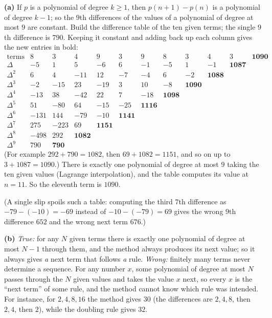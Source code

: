 \textbf{(a)} If $p$ is a polynomial of degree $k\ge1$, then $p(n+1)-p(n)$ is a polynomial of degree $k-1$; so the $9$th differences of the values of a polynomial of degree at most $9$ are constant. Build the difference table of the ten given terms; the single $9$th difference is $790$. Keeping it constant and adding back up each column gives the new entries in bold:
\[\begin{array}{c|ccccccccccc}
\text{terms}&8&3&4&9&3&9&8&3&4&3&\mathbf{1090}\\
\Delta&-5&1&5&-6&6&-1&-5&1&-1&\mathbf{1087}&\\
\Delta^2&6&4&-11&12&-7&-4&6&-2&\mathbf{1088}&&\\
\Delta^3&-2&-15&23&-19&3&10&-8&\mathbf{1090}&&&\\
\Delta^4&-13&38&-42&22&7&-18&\mathbf{1098}&&&&\\
\Delta^5&51&-80&64&-15&-25&\mathbf{1116}&&&&&\\
\Delta^6&-131&144&-79&-10&\mathbf{1141}&&&&&&\\
\Delta^7&275&-223&69&\mathbf{1151}&&&&&&&\\
\Delta^8&-498&292&\mathbf{1082}&&&&&&&&\\
\Delta^9&790&\mathbf{790}&&&&&&&&&
\end{array}\]
(For example $292+790=1082$, then $69+1082=1151$, and so on up to $3+1087=1090$.) There is exactly one polynomial of degree at most $9$ taking the ten given values (Lagrange interpolation), and the table computes its value at $n=11$. So the eleventh term is $\boxed{1090}$.

(A single slip spoils such a table: computing the third $7$th difference as $-79-(-10)=-69$ instead of $-10-(-79)=69$ gives the wrong $9$th difference $652$ and the wrong next term $676$.)

\textbf{(b)} \emph{True:} for any $N$ given terms there is exactly one polynomial of degree at most $N-1$ through them, and the method always produces its next value; so it always gives \emph{a} next term that follows \emph{a} rule. \emph{Wrong:} finitely many terms never determine a sequence. For any number $x$, some polynomial of degree at most $N$ passes through the $N$ given values and takes the value $x$ next, so every $x$ is the ``next term'' of some rule, and the method cannot know which rule was intended. For instance, for $2,4,8,16$ the method gives $30$ (the differences are $2,4,8$, then $2,4$, then $2$), while the doubling rule gives $32$.
